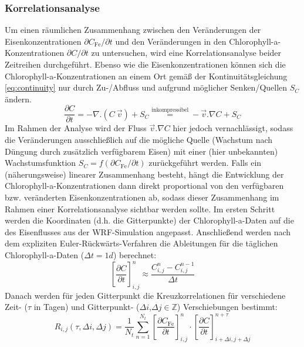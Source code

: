 \documentclass[12pt,a4paper,onecolumn,headheight=30pt]{scrartcl}
\begin{document}
\subsubsection{Korrelationsanalyse} \label{sec:methods_correlation}
Um einen räumlichen Zusammenhang zwischen den Veränderungen der Eisenkonzentrationen $\partial C_\text{Fe} / \partial t$ und den Veränderungen in den Chlorophyll-a-Konzentrationen $\partial C / \partial t$ zu untersuchen, wird eine Korrelationsanalyse beider Zeitreihen durchgeführt. Ebenso wie die Eisenkonzentrationen können sich die Chlorophyll-a-Konzentrationen an einem Ort gemäß der Kontinuitätsgleichung \ref{eq:continuity} nur durch Zu-/Abfluss und aufgrund möglicher Senken/Quellen $S_C$ ändern.
\begin{equation}
\frac{\partial C}{\partial t} = - \nabla . (C \ \vec{v}) + S_C  \overset{\text{inkompressibel}}{=} - \vec{v}.\nabla C + S_C \label{eq:continuity}
\end{equation}
Im Rahmen der Analyse wird der Fluss $\vec{v}.\nabla C$ hier jedoch vernachlässigt, sodass die Veränderungen ausschließlich auf die mögliche Quelle (Wachstum nach Düngung durch zusätzlich verfügbarem Eisen) mit einer (hier unbekannten) Wachstumsfunktion $S_C = f(\partial C_\text{Fe} / \partial t)$ zurückgeführt werden. Falls ein (näherungsweise) linearer Zusammenhang besteht, hängt die Entwicklung der Chlorophyll-a-Konzentrationen dann direkt proportional von den verfügbaren bzw. veränderten Eisenkonzentrationen ab, sodass dieser Zusammenhang im Rahmen einer Korrelationsanalyse sichtbar werden sollte. Im ersten Schritt werden die Koordinaten (d.h. die Gitterpunkte) der Chlorophyll-a-Daten auf die des Eisenflusses aus der WRF-Simulation angepasst. Anschließend werden nach dem expliziten Euler-Rückwärts-Verfahren die Ableitungen für die täglichen Chlorophyll-a-Daten ($\Delta t = 1d$) berechnet:
\begin{equation}
\left[\frac{\partial C}{\partial t}\right]_{i,j}^{n} \approx \frac{C_{i,j}^n-C_{i,j}^{n-1}}{\Delta t}
\end{equation}
Danach werden für jeden Gitterpunkt die Kreuzkorrelationen für verschiedene Zeit- ($\tau$ in Tagen) und Gitterpunkt- ($\Delta i$,$\Delta j \in \mathbb{Z}$) Verschiebungen bestimmt:
\begin{equation}
R_{i,j}(\tau,\Delta i, \Delta j)= \frac{1}{N_t}\sum\limits_{n=1}^{N_t} \left[\frac{\partial C_\text{Fe}}{\partial t}\right]_{i,j}^n \cdot \left[\frac{\partial C}{\partial t}\right]_{i+\Delta i ,j+\Delta j}^{n+\tau}
\end{equation}
\end{document}
